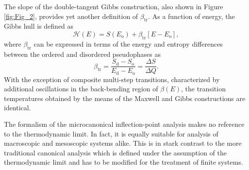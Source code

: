 \documentclass[12pt]{report}
\begin{document}
The slope of the double-tangent Gibbs construction, also shown in Figure \ref{fig:Fig_2}, provides yet another definition of $\beta_{\mathrm{tr}}$. As a function of energy, the Gibbs hull is defined as
\begin{equation}
\mathcal{H}(E) = S(E_{\mathrm{o}}) + \beta_{\mathrm{tr}}[E-E_{\mathrm{o}}],
\end{equation}
where $\beta_{\mathrm{tr}}$ can be expressed in terms of the energy and entropy differences between the ordered and disordered pseudophases as
\begin{equation}
\beta_{\mathrm{tr}} = \frac{S_{\mathrm{d}}-S_{\mathrm{o}}}{E_{\mathrm{d}}-E_{\mathrm{o}}} = \frac{\Delta S}{\Delta Q}.
\end{equation}
With the exception of composite multi-step transitions, characterized by additional oscillations in the back-bending region of $\beta(E)$, the transition temperatures obtained by the means of the Maxwell and Gibbs constructions are identical.

The formalism of the microcanonical inflection-point analysis makes no reference to the thermodynamic limit. In fact, it is equally suitable for analysis of macroscopic and mesoscopic systems alike. This is in stark contrast to the more traditional canonical analysis which is defined under the assumption of the thermodynamic limit and has to be modified for the treatment of finite systems.

 
 
\end{document}
